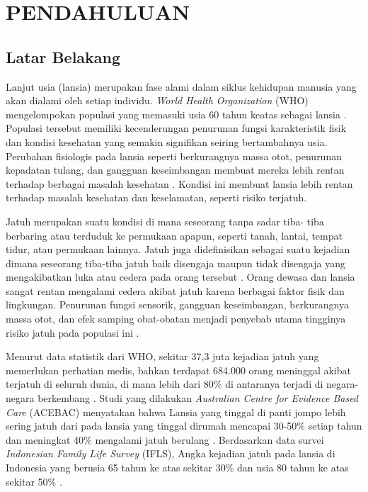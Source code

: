 \newpage
\pagestyle{fancy}
\fancyhf{}
\fancyhead[R]{\thepage}
\chapter{PENDAHULUAN} \label{Bab I}

\section{Latar Belakang} \label{I.latar belakang}
Lanjut usia (lansia) merupakan fase alami dalam siklus kehidupan manusia yang akan dialami oleh setiap individu. \textit{World Health Organization} (WHO) mengelompokan populasi yang memasuki usia 60 tahun  keatas sebagai lansia \cite{Gusti2023}. Populasi tersebut memiliki kecenderungan penurunan fungsi karakteristik fisik dan kondisi kesehatan  yang semakin signifikan seiring bertambahnya usia. Perubahan fisiologis pada lansia seperti berkurangnya massa otot, penurunan kepadatan tulang, dan gangguan keseimbangan membuat mereka lebih rentan terhadap berbagai masalah kesehatan \cite{Colon2018}. Kondisi ini membuat lansia lebih rentan terhadap masalah kesehatan dan keselamatan, seperti risiko terjatuh. \par

Jatuh merupakan suatu kondisi di mana seseorang tanpa sadar tiba- tiba berbaring atau terduduk ke permukaan apapun, seperti tanah, lantai, tempat tidur, atau permukaan lainnya. Jatuh juga didefinisikan sebagai suatu kejadian dimana seseorang tiba-tiba jatuh baik disengaja maupun tidak disengaja yang mengakibatkan luka atau cedera pada orang tersebut \cite{Forrest2012}. Orang dewasa dan lansia sangat rentan mengalami cedera akibat jatuh karena berbagai faktor fisik dan lingkungan. Penurunan fungsi sensorik, gangguan keseimbangan, berkurangnya massa otot, dan efek samping obat-obatan menjadi penyebab utama tingginya risiko jatuh pada populasi ini \cite{Colon2024}.\par

Menurut data statistik dari WHO, sekitar 37,3 juta kejadian jatuh yang memerlukan perhatian medis, bahkan terdapat 684.000 orang meninggal akibat terjatuh di seluruh dunia, di mana lebih dari 80\% di antaranya terjadi di negara-negara berkembang \cite{Who2021}. Studi yang dilakukan \textit{Australian Centre for Evidence Based Care} (ACEBAC) menyatakan bahwa Lansia yang tinggal di panti jompo lebih sering jatuh dari pada lansia yang tinggal dirumah mencapai 30-50\% setiap tahun dan meningkat 40\% mengalami jatuh berulang \cite{ACEBAC2023}. Berdasarkan data survei \textit{Indonesian Family Life Survey} (IFLS), Angka kejadian jatuh pada lansia di Indonesia yang berusia 65 tahun ke atas sekitar 30\% dan usia 80 tahun ke atas sekitar 50\% \cite{Gusti2023}.\par

